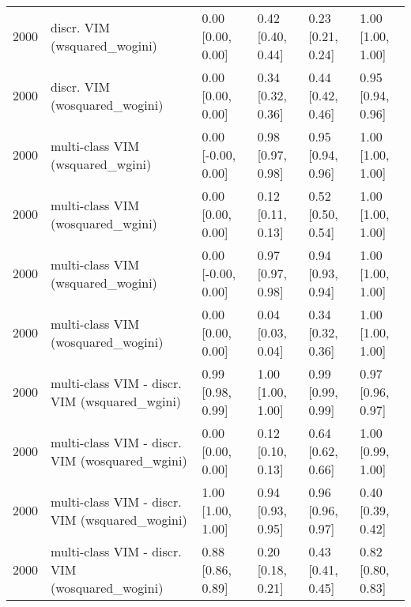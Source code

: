 \begin{table}[ht]
\begin{tabular}{rlllll}
  2000 & discr. VIM (wsquared\_wogini) & 0.00 [0.00, 0.00] & 0.42 [0.40, 0.44] & 0.23 [0.21, 0.24] & 1.00 [1.00, 1.00] \\ 
  2000 & discr. VIM (wosquared\_wogini) & 0.00 [0.00, 0.00] & 0.34 [0.32, 0.36] & 0.44 [0.42, 0.46] & 0.95 [0.94, 0.96] \\ 
  2000 & multi-class VIM (wsquared\_wgini) & 0.00 [-0.00, 0.00] & 0.98 [0.97, 0.98] & 0.95 [0.94, 0.96] & 1.00 [1.00, 1.00] \\ 
  2000 & multi-class VIM (wosquared\_wgini) & 0.00 [0.00, 0.00] & 0.12 [0.11, 0.13] & 0.52 [0.50, 0.54] & 1.00 [1.00, 1.00] \\ 
  2000 & multi-class VIM (wsquared\_wogini) & 0.00 [-0.00, 0.00] & 0.97 [0.97, 0.98] & 0.94 [0.93, 0.94] & 1.00 [1.00, 1.00] \\ 
  2000 & multi-class VIM (wosquared\_wogini) & 0.00 [0.00, 0.00] & 0.04 [0.03, 0.04] & 0.34 [0.32, 0.36] & 1.00 [1.00, 1.00] \\ 
  2000 & multi-class VIM - discr. VIM (wsquared\_wgini) & 0.99 [0.98, 0.99] & 1.00 [1.00, 1.00] & 0.99 [0.99, 0.99] & 0.97 [0.96, 0.97] \\ 
  2000 & multi-class VIM - discr. VIM (wosquared\_wgini) & 0.00 [0.00, 0.00] & 0.12 [0.10, 0.13] & 0.64 [0.62, 0.66] & 1.00 [0.99, 1.00] \\ 
  2000 & multi-class VIM - discr. VIM (wsquared\_wogini) & 1.00 [1.00, 1.00] & 0.94 [0.93, 0.95] & 0.96 [0.96, 0.97] & 0.40 [0.39, 0.42] \\ 
  2000 & multi-class VIM - discr. VIM (wosquared\_wogini) & 0.88 [0.86, 0.89] & 0.20 [0.18, 0.21] & 0.43 [0.41, 0.45] & 0.82 [0.80, 0.83] \\ 
   \hline
\end{tabular}
\end{table}
